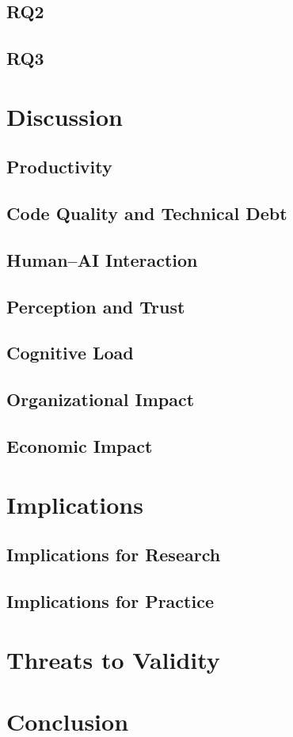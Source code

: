 \documentclass[smallextended]{svjour3}
\begin{document}
\subsection{RQ2}

\subsection{RQ3}

\section{Discussion}

\subsection{Productivity}

\subsection{Code Quality and Technical Debt}

\subsection{Human--AI Interaction}

\subsection{Perception and Trust}

\subsection{Cognitive Load}

\subsection{Organizational Impact}

\subsection{Economic Impact}

\section{Implications}

\subsection{Implications for Research}

\subsection{Implications for Practice}

\section{Threats to Validity}

\section{Conclusion}



\end{document}
